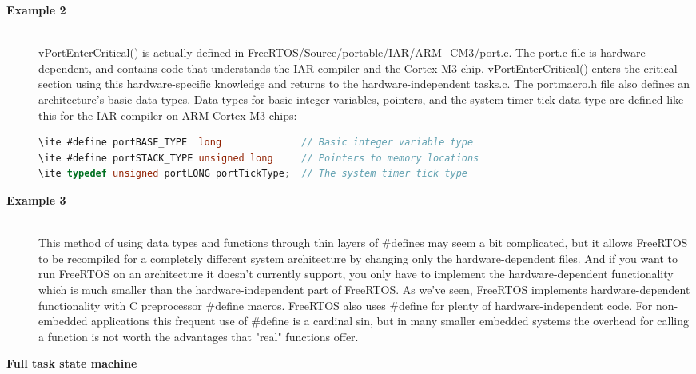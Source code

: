 \begin{description}
\os{\newpage}



\item[{\rot\bf Example 2}]~\\[-3ex]
\bi
\ite vPortEnterCritical() is actually defined in FreeRTOS/Source/portable/IAR/ARM\_CM3/port.c. The port.c file is hardware-dependent, and contains code that understands the IAR compiler and the Cortex-M3 chip. vPortEnterCritical() enters the critical section using this hardware-specific knowledge and returns to the hardware-independent tasks.c.
\ite
\ite The portmacro.h file also defines an architecture's basic data types. Data types for basic integer variables, pointers, and the system timer tick data type are defined like this for the IAR compiler on ARM Cortex-M3 chips:
\begin{lstlisting}[language=C]
\ite #define portBASE_TYPE  long              // Basic integer variable type
\ite #define portSTACK_TYPE unsigned long     // Pointers to memory locations
\ite typedef unsigned portLONG portTickType;  // The system timer tick type
\end{lstlisting}
\ei

\os{\newpage}



\item[{\rot\bf Example 3}]~\\[-3ex]
\bi
\ite This method of using data types and functions through thin layers of \#defines may seem a bit complicated, but it allows FreeRTOS to be recompiled for a completely different system architecture by changing only the hardware-dependent files. And if you want to run FreeRTOS on an architecture it doesn't currently support, you only have to implement the hardware-dependent functionality which is much smaller than the hardware-independent part of FreeRTOS.
\ite
\ite As we've seen, FreeRTOS implements hardware-dependent functionality with C preprocessor \#define macros. FreeRTOS also uses \#define for plenty of hardware-independent code. For non-embedded applications this frequent use of \#define is a cardinal sin, but in many smaller embedded systems the overhead for calling a function is not worth the advantages that "real" functions offer.
\ei

\os{\newpage}



\item[{\rot\bf Full task state machine}]~\\[-3ex]

\os{\newpage}



\end{description}
